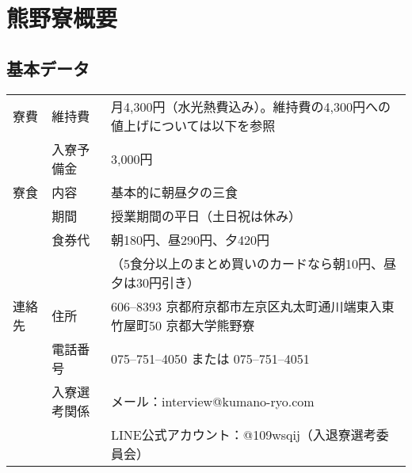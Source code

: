 \section{熊野寮概要} \label{sec:abst}

		\subsection{基本データ} \label{subsec:data}
		\begin{table}[htbp]
      \begin{tabular}{|l|l|l|}
      \hline
      寮費\index{りょうひ@寮費|also {維持費}}  & 維持費\index{いじひ@維持費|also {寮費}}    & 月4,300円（水光熱費込み）。維持費の4,300円への値上げについては以下を参照                    \\
          & 入寮予備金  & 3,000円                                                       \\ \hline
      寮食\index{りょうしょく@寮食}  & 内容     & 基本的に朝昼夕の三食                                                   \\
          & 期間     & 授業期間の平日（土日祝は休み）                \\
          & 食券代\index{りょうしょく@寮食!のねだん@---の値段}    & 朝180円、昼290円、夕420円 \\
         　&　& （5食分以上のまとめ買いのカードなら朝10円、昼夕は30円引き）         \\ \hline
      連絡先\index{くまのりょう@熊野寮!のれんらくさき@---の連絡先
      } & 住所\index{くまのりょう@熊野寮!のじゅうしょ@---の住所}   & 606--8393 京都府京都市左京区丸太町通川端東入東竹屋町50 京都大学熊野寮                     \\
          & 電話番号\index{くまのりょう@熊野寮!のでんわばんごう@---の電話番号
          }   & 075--751--4050 または 075--751--4051                                \\
          & 入寮選考関係\index{にゅうりょう@入寮!にかんするといあわせ@---に関する問い合わせ} & メール：interview@kumano-ryo.com \\
          　&　& LINE公式アカウント：@109wsqij（入退寮選考委員会） \\ \hline
      \end{tabular}
      \end{table}
